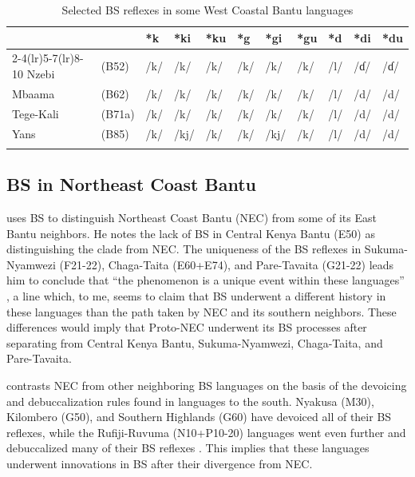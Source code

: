 \documentclass[output=paper,colorlinks,citecolor=brown
]{langscibook}
\begin{document}
\begin{table}
\caption{Selected BS reflexes in some West Coastal Bantu languages
\citep{Guthrie}
}

\label{tab:kieffer:KLC}
 \begin{tabular}{lllllllllll}
  \lsptoprule
 & & *k & *ki & *ku & *g & *gi & *gu & *d & *di & *du\\
  \cmidrule(lr){2-4}\cmidrule(lr){5-7}\cmidrule(lr){8-10}
 Nzebi & (B52) &/k/ & /k/ & /k/ & /k/ & /k/ & /k/ & /l/ & /ɗ/ & /ɗ/\\
 Mbaama & (B62) &/k/ & /k/ & /k/ & /k/ & /k/ & /k/ & /l/ & /d/ & /d/\\
 Tege-Kali &(B71a) &  /k/ & /k/ & /k/ & /k/ & /k/ & /k/ & /l/ & /d/ & /d/\\
Yans &  (B85) & /k/ & /kj/ & /k/ & /k/ & /kj/ & /k/ & /l/ & /d/ & /d/\\
  \lspbottomrule
 \end{tabular}
\end{table}

\subsection{BS in Northeast Coast Bantu}

\citet{hinnebusch1981} uses BS to distinguish Northeast Coast Bantu (NEC) from some of its East Bantu neighbors. He notes the lack of BS in Central Kenya Bantu (E50) as distinguishing the clade from NEC. The uniqueness of the BS reflexes in Sukuma-Nyamwezi (F21-22), Chaga-Taita (E60+E74), and Pare-Tavaita (G21-22) leads him to conclude that “the phenomenon is a unique event within these languages” \citet[40]{hinnebusch1981}, a line which, to me, seems to claim that BS underwent a different history in these languages than the path taken by NEC and its southern neighbors. These differences would imply that Proto-NEC underwent its BS processes after separating from Central Kenya Bantu, Sukuma-Nyamwezi, Chaga-Taita, and Pare-Tavaita. 

\citeauthor{hinnebusch1981} contrasts NEC from other neighboring BS languages on the basis of the devoicing and debuccalization rules found in languages to the south. Nyakusa (M30), Kilombero (G50), and Southern Highlands (G60) have devoiced all of their BS reflexes, while the Rufiji-Ruvuma (N10+P10-20) languages went even further and debuccalized many of their BS reflexes \citep{hinnebusch1981}. This implies that these languages underwent innovations in BS after their divergence from NEC. 
\end{document}
